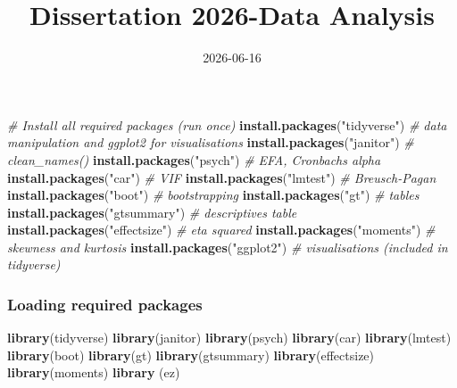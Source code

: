 \documentclass[
]{article}
\title{Dissertation 2026-Data Analysis}
\author{}
\date{\vspace{-2.5em}2026-06-16}
\newenvironment{Shaded}{\begin{snugshade}}{\end{snugshade}}
\newcommand{\CommentTok}[1]{\textcolor[rgb]{0.56,0.35,0.01}{\textit{#1}}}
\newcommand{\FunctionTok}[1]{\textcolor[rgb]{0.13,0.29,0.53}{\textbf{#1}}}
\newcommand{\NormalTok}[1]{#1}
\newcommand{\StringTok}[1]{\textcolor[rgb]{0.31,0.60,0.02}{#1}}
\begin{document}
\maketitle

\begin{Shaded}
\begin{Highlighting}[]
\CommentTok{\# Install all required packages (run once)}
\FunctionTok{install.packages}\NormalTok{(}\StringTok{"tidyverse"}\NormalTok{)      }\CommentTok{\# data manipulation and ggplot2 for visualisations}
\FunctionTok{install.packages}\NormalTok{(}\StringTok{"janitor"}\NormalTok{)        }\CommentTok{\# clean\_names()}
\FunctionTok{install.packages}\NormalTok{(}\StringTok{"psych"}\NormalTok{)          }\CommentTok{\# EFA, Cronbach\textquotesingle{}s alpha}
\FunctionTok{install.packages}\NormalTok{(}\StringTok{"car"}\NormalTok{)            }\CommentTok{\# VIF}
\FunctionTok{install.packages}\NormalTok{(}\StringTok{"lmtest"}\NormalTok{)         }\CommentTok{\# Breusch{-}Pagan}
\FunctionTok{install.packages}\NormalTok{(}\StringTok{"boot"}\NormalTok{)           }\CommentTok{\# bootstrapping}
\FunctionTok{install.packages}\NormalTok{(}\StringTok{"gt"}\NormalTok{)             }\CommentTok{\# tables}
\FunctionTok{install.packages}\NormalTok{(}\StringTok{"gtsummary"}\NormalTok{)      }\CommentTok{\# descriptives table}
\FunctionTok{install.packages}\NormalTok{(}\StringTok{"effectsize"}\NormalTok{)     }\CommentTok{\# eta squared}
\FunctionTok{install.packages}\NormalTok{(}\StringTok{"moments"}\NormalTok{)        }\CommentTok{\# skewness and kurtosis}
\FunctionTok{install.packages}\NormalTok{(}\StringTok{"ggplot2"}\NormalTok{)        }\CommentTok{\# visualisations (included in tidyverse)}
\end{Highlighting}
\end{Shaded}

\subsubsection{Loading required
packages}\label{loading-required-packages}

\begin{Shaded}
\begin{Highlighting}[]
\FunctionTok{library}\NormalTok{(tidyverse)}
\FunctionTok{library}\NormalTok{(janitor)}
\FunctionTok{library}\NormalTok{(psych)}
\FunctionTok{library}\NormalTok{(car)}
\FunctionTok{library}\NormalTok{(lmtest)}
\FunctionTok{library}\NormalTok{(boot)}
\FunctionTok{library}\NormalTok{(gt)}
\FunctionTok{library}\NormalTok{(gtsummary)}
\FunctionTok{library}\NormalTok{(effectsize)}
\FunctionTok{library}\NormalTok{(moments)}
\FunctionTok{library}\NormalTok{ (ez)}
\end{Highlighting}
\end{Shaded}
\end{document}

